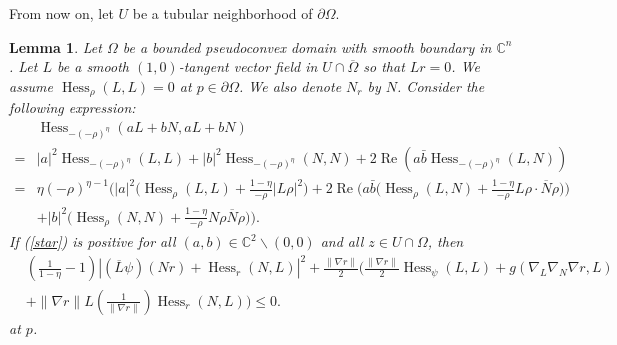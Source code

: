 \documentclass[11pt]{article}
\theoremstyle{plain} \numberwithin{equation}{section}
\newtheorem{lemma}[theorem]{Lemma}
\theoremstyle{definition}
\DeclareMathOperator{\Hessian}{Hess}
\renewcommand{\Re}{\operatorname{Re}}
\begin{document}
	From now on, let $U$ be a tubular neighborhood of $\partial\Omega$. 
	\begin{lemma}\label{2.2}
			Let $\Omega$ be a bounded pseudoconvex domain with smooth boundary in $\mathbb{C}^n$. Let $L$ be a smooth $(1,0)$-tangent vector field in $U\cap\overline{\Omega}$ so that $Lr=0$. We assume $\Hessian_\rho(L, L)=0$ at $p\in \partial\Omega$. We also denote $N_r$ by $N$.  Consider the following expression:
			\begin{equation}\label{star}
		\begin{split}
					&\Hessian_{-(-\rho)^\eta }(aL+bN,aL+bN)\\=&|a|^2\Hessian_{-(-\rho)^\eta}(L, L)+|b|^2\Hessian_{-(-\rho)^\eta }(N, N)+2\Re (a\bar{b}\Hessian_{-(-\rho)^\eta }(L, N))\\=&\eta (-\rho)^{\eta-1}\Bigg(|a|^2\Big(\Hessian_\rho (L, L)+\frac{1-\eta}{-\rho}|L\rho|^2\Big)+2\Re \Big(a\bar{b}\Big(\Hessian_\rho (L, N)+\frac{1-\eta}{-\rho}L\rho\cdot\overline{N}\rho\Big)\Big)\\&+|b|^2 \Big(\Hessian_\rho (N, N)+\frac{1-\eta}{-\rho}N\rho\overline{N} \rho\Big)\Bigg).
				\end{split}
			\end{equation}
		If (\ref{star}) is positive for all $(a,b)\in\mathbb{C}^2\backslash(0,0)$ and all $z\in U\cap\Omega$, then
			\[\begin{split}
			&\left(\frac{1}{1-\eta}-1\right)\left|(\overline{L}\psi)(Nr)+\Hessian_r(N, L)\right|^2+\frac{\|\nabla r\|}{2}\Bigg(\frac{\|\nabla r\|}{2}\Hessian_\psi(L, L)+g(\nabla_L\nabla_N\nabla r, L)\\&+\|\nabla r\|L\left(\frac{1}{\|\nabla r\|}\right)\Hessian_r(N, L)\Bigg)\leq 0.\end{split}
			\] at $p$. 
	\end{lemma}
\end{document}
